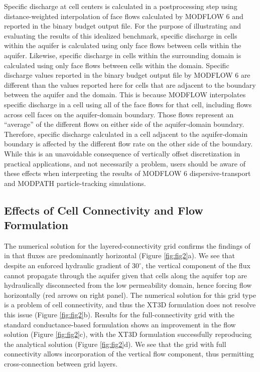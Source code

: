 \documentclass{article}
\begin{document}
Specific discharge at cell centers is calculated in a postprocessing step using distance-weighted interpolation of face flows calculated by MODFLOW 6 and reported in the binary budget output file. For the purpose of illustrating and evaluating the results of this idealized benchmark, specific discharge in cells within the aquifer is calculated using only face flows between cells within the aquifer. Likewise, specific discharge in cells within the surrounding domain is calculated using only face flows between cells within the domain. Specific discharge values reported in the binary budget output file by MODFLOW 6 are different than the values reported here for cells that are adjacent to the boundary between the aquifer and the domain. This is because MODFLOW interpolates specific discharge in a cell using all of the face flows for that cell, including flows across cell faces on the aquifer-domain boundary. Those flows represent an ``average'' of the different flows on either side of the aquifer-domain boundary. Therefore, specific discharge calculated in a cell adjacent to the aquifer-domain boundary is affected by the different flow rate on the other side of the boundary. While this is an unavoidable consequence of vertically offset discretization in practical applications, and not necessarily a problem, users should be aware of these effects when interpreting the results of MODFLOW 6 dispersive-transport and MODPATH particle-tracking simulations.

\subsection{Effects of Cell Connectivity and Flow Formulation}

The numerical solution for the layered-connectivity grid confirms the findings of \cite{bardot2022} in that fluxes are predominantly horizontal (Figure \ref{fig:fig2}a). We see that despite an enforced hydraulic gradient of $30^{\circ}$, the vertical component of the flux cannot propagate through the aquifer given that cells along the aquifer top are hydraulically disconnected from the low permeability domain, hence forcing flow horizontally (red arrows on right panel). The numerical solution for this grid type is a problem of cell connectivity, and thus the XT3D formulation does not resolve this issue (Figure \ref{fig:fig2}b). Results for the full-connectivity grid with the standard conductance-based formulation shows an improvement in the flow solution (Figure \ref{fig:fig2}c), with the XT3D formulation successfully reproducing the analytical solution (Figure \ref{fig:fig2}d). We see that the grid with full connectivity allows incorporation of the vertical flow component, thus permitting cross-connection between grid layers.
\end{document}
